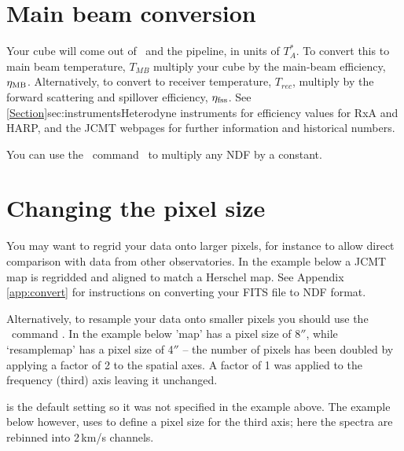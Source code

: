 \documentclass[11pt,oneside,chapters]{starlink}
\providecommand{\arcm}{\si{\arcminute}}%
\providecommand{\arcsec}{\si{\arcsecond}}%
\begin{document}
\section{Main beam conversion}
\label{sec:mult}

Your cube will come out of \makecube\, and the pipeline, in units of
$T_A^*$. To convert this to main beam temperature, $T_{MB}$ multiply
your cube by the main-beam efficiency, $\eta_\textnormal{MB}$. Alternatively, to
convert to receiver temperature, $T_{rec}$, multiply by the forward
scattering and spillover efficiency, $\eta_\textnormal{fss}$.  See
\cref{Section}{sec:instruments}{Heterodyne instruments} for efficiency
values for RxA and HARP, and the JCMT webpages for further information
and historical numbers.

You can use the \Kappa\ command \cmult\ to multiply any NDF by a constant.

\begin{terminalv}
\end{terminalv}

\section{Changing the pixel size}
\label{sec:rebin}

You may want to regrid your data onto larger pixels, for instance to
allow direct comparison with data from other observatories. In the
example below a JCMT map is regridded and aligned to match a Herschel
map. See Appendix \ref{app:convert} for instructions on converting
your FITS file to NDF format.
\begin{terminalv}
\end{terminalv}

Alternatively, to resample your data onto smaller pixels you should
use the \Kappa\ command \sqorst. In the example below 'map' has a
pixel size of 8$\arcsec$, while `resamplemap' has a pixel size of 4$\arcsec$ --
the number of pixels has been doubled by applying a factor of 2 to the
spatial axes. A factor of 1 was applied to the frequency (third) axis
leaving it unchanged.
\begin{terminalv}
\end{terminalv}
 is the default setting so it was not specified in
the example above. The example below however, uses
 to define a pixel size for the third axis;
here the spectra are rebinned into 2\,km/s channels.
\begin{terminalv}
\end{terminalv}
\end{document}
